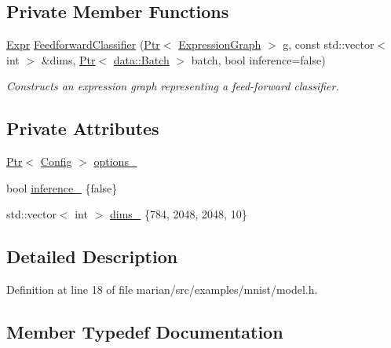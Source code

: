 \subsection*{Private Member Functions}
\begin{DoxyCompactItemize}
\item 
\hyperlink{namespacemarian_a498d8baf75b754011078b890b39c8e12}{Expr} \hyperlink{classmarian_1_1models_1_1MNISTModel_ad6f17d5d5db7302dd4a9daec556ed121}{Feedforward\+Classifier} (\hyperlink{namespacemarian_ad1a373be43a00ef9ce35666145137b08}{Ptr}$<$ \hyperlink{classmarian_1_1ExpressionGraph}{Expression\+Graph} $>$ g, const std\+::vector$<$ int $>$ \&dims, \hyperlink{namespacemarian_ad1a373be43a00ef9ce35666145137b08}{Ptr}$<$ \hyperlink{classmarian_1_1data_1_1Batch}{data\+::\+Batch} $>$ batch, bool inference=false)
\begin{DoxyCompactList}\small\item\em Constructs an expression graph representing a feed-\/forward classifier. \end{DoxyCompactList}\end{DoxyCompactItemize}
\subsection*{Private Attributes}
\begin{DoxyCompactItemize}
\item 
\hyperlink{namespacemarian_ad1a373be43a00ef9ce35666145137b08}{Ptr}$<$ \hyperlink{classmarian_1_1Config}{Config} $>$ \hyperlink{classmarian_1_1models_1_1MNISTModel_a89534bc9dc7dfea0acb2292be4037252}{options\+\_\+}
\item 
bool \hyperlink{classmarian_1_1models_1_1MNISTModel_af7d608f3d2ebb6f2dfb1d37eaaa4152a}{inference\+\_\+} \{false\}
\item 
std\+::vector$<$ int $>$ \hyperlink{classmarian_1_1models_1_1MNISTModel_a2fff9a2599bb88f2d59ca9a2f062b491}{dims\+\_\+} \{784, 2048, 2048, 10\}
\end{DoxyCompactItemize}


\subsection{Detailed Description}


Definition at line 18 of file marian/src/examples/mnist/model.\+h.



\subsection{Member Typedef Documentation}
